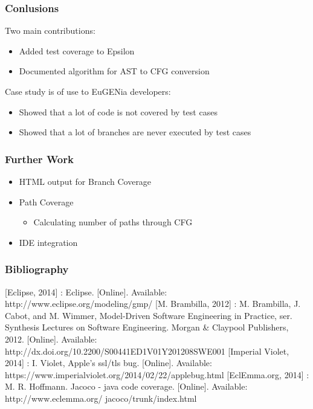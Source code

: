 \begin{frame}
\frametitle{Conlusions}
Two main contributions:
\begin{itemize}
	\item Added test coverage to Epsilon
	\item Documented algorithm for AST to CFG conversion
\end{itemize}
\vspace{5.00mm}
Case study is of use to EuGENia developers:
\begin{itemize}
\item Showed that a lot of code is not covered by test cases
\item Showed that a lot of branches are never executed by test cases
\end{itemize}
\end{frame}

\begin{frame}
\frametitle{Further Work}
\begin{itemize}
\item HTML output for Branch Coverage
\item Path Coverage
\begin{itemize}
	\item Calculating number of paths through CFG
\end{itemize}
\item IDE integration
\end{itemize}
\end{frame}

\begin{frame}
\frametitle{Bibliography}
[Eclipse, 2014] : Eclipse. [Online]. Available: http://www.eclipse.org/modeling/gmp/
[M. Brambilla, 2012] : M. Brambilla, J. Cabot, and M. Wimmer, Model-Driven Software Engineering in Practice, ser. Synthesis Lectures on Software Engineering. Morgan \& Claypool Publishers, 2012. [Online]. Available: http://dx.doi.org/10.2200/S00441ED1V01Y201208SWE001
[Imperial Violet, 2014] : I. Violet, Apple's ssl/tls bug. [Online]. Available: https://www.imperialviolet.org/2014/02/22/applebug.html
[EclEmma.org, 2014] : M. R. Hoffmann. Jacoco - java code coverage. [Online]. Available: http://www.eclemma.org/ jacoco/trunk/index.html
%
\end{frame}
